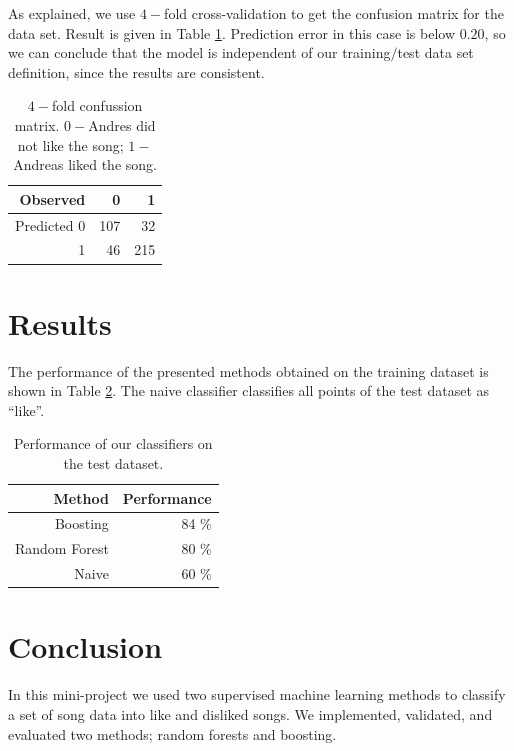 \documentclass{article}
\begin{document}
As explained, we use $4-$fold cross-validation to get the confusion matrix for the data set. Result is given in Table \ref{tab:confussion_matrix}. Prediction error in this case is below $0.20$, so we can conclude that the model is independent of our training$/$test data set definition, since the results are consistent.

\begin {table}[h]
\begin{center}
\begin{tabular}{r|r|r}
  Observed & 0  & 1 \\
  \hline			
  Predicted 0 & 107 & 32 \\
  1 & 46 & 215 \\ 
\end{tabular}
\end{center}
\caption {$4-$fold confussion matrix. $0-$Andres did not like the song; $1-$Andreas liked the song.} 
\label{tab:confussion_matrix} 
\end {table}

\section{Results}

The performance of the presented methods obtained on the training dataset is shown in Table \ref{tab:performance}.
The naive classifier classifies all points of the test dataset as ``like''.

\begin {table}[h]
\begin{center}
\begin{tabular}{r|r}
  Method & Performance   \\
  \hline			
  Boosting & 84 \% \\
  Random Forest & 80 \% \\
  Naive & 60 \%
\end{tabular}
\end{center}
\caption {Performance of our classifiers on the test dataset.} 
\label{tab:performance} 
\end {table}

\section{Conclusion}

In this mini-project we used two supervised machine learning methods to classify a set of song data into like and disliked songs.
We implemented, validated, and evaluated two methods; random forests and boosting.
\end{document}
